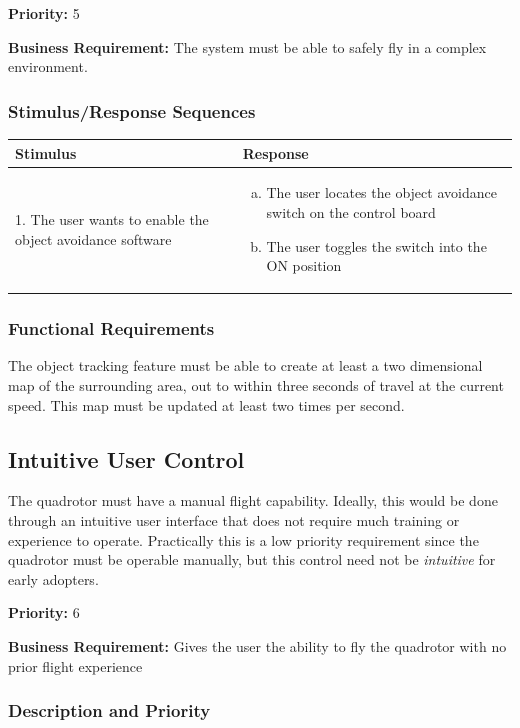 \documentclass[english]{article}
\numberwithin{equation}{section} %
\begin{document}
\textbf{Priority:} 5

\textbf{Business Requirement:} The system must be able to safely fly in a complex environment.

\subsubsection{Stimulus/Response Sequences}

\begin{tabular}{p{3cm} | p{8.5cm}}
\hline
\textbf{Stimulus} & \textbf{Response}\\
\hline
1. The user wants to enable the object avoidance software &
\begin{enumerate}[(a)]\itemsep1pt %
\item The user locates the object avoidance switch on the control board
\item The user toggles the switch into the ON position
\end{enumerate}
\\ 
\hline
\end{tabular}
\subsubsection{Functional Requirements}
The object tracking feature must be able to create at least a two dimensional map of the surrounding area, out to within three seconds of travel at the current speed. This map must be updated at least two times per second.


\bigskip
\subsection{Intuitive User Control}
The quadrotor must have a manual flight capability. Ideally, this would be done through an intuitive user interface that does not require much training or experience to operate. Practically this is a low priority requirement since the quadrotor must be operable manually, but this control need not be \textit{intuitive} for early adopters.

\textbf{Priority:} 6

\textbf{Business Requirement:} Gives the user the ability to fly the quadrotor with no prior flight experience
 
\subsubsection{Description and Priority}
\end{document}

